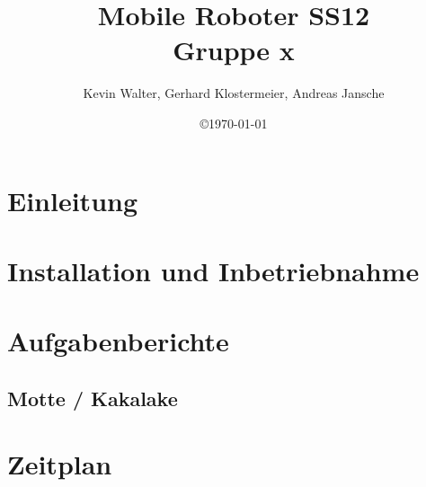 \documentclass[a4paper,12pt]{scrartcl}[1970/01/01]
\title{Mobile Roboter SS12\\Gruppe x}
\author{Kevin Walter, Gerhard Klostermeier, Andreas Jansche}
\date{\copyright\space\today}
\begin{document}
\maketitle
\newpage

\tableofcontents
\newpage



\section{Einleitung}

\newpage

\section{Installation und Inbetriebnahme}

\newpage

\section{Aufgabenberichte}
\subsection{Motte / Kakalake}

%
%

\section{Zeitplan}



%
\end{document}
